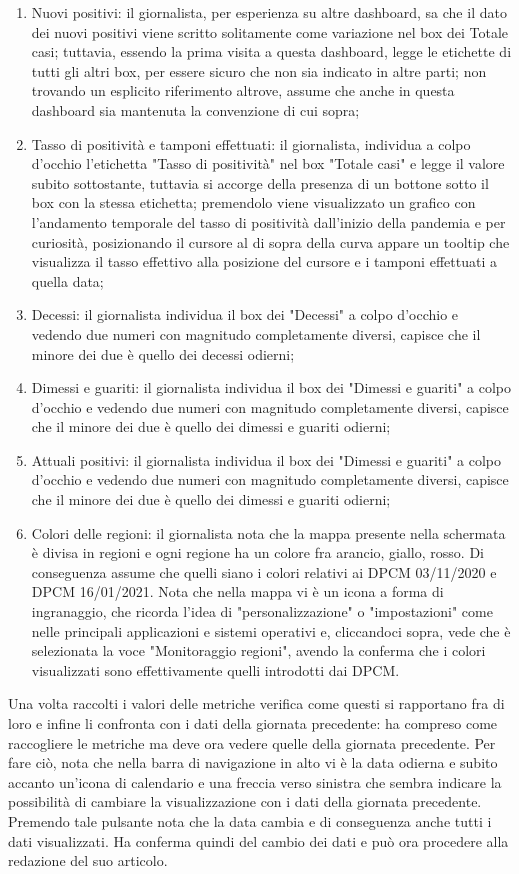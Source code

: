 \begin{enumerate}[label=\alph*.]
    \item Nuovi positivi: il giornalista, per esperienza su altre dashboard, sa che il dato dei nuovi positivi viene scritto solitamente come variazione nel box dei Totale casi; tuttavia, essendo la prima visita a questa dashboard, legge le etichette di tutti gli altri box, per essere sicuro che non sia indicato in altre parti; non trovando un esplicito riferimento altrove, assume che anche in questa dashboard sia mantenuta la convenzione di cui sopra;
    \item Tasso di positività e tamponi effettuati: il giornalista, individua a colpo d'occhio l'etichetta "Tasso di positività" nel box "Totale casi" e legge il valore subito sottostante, tuttavia si accorge della presenza di un bottone sotto il box con la stessa etichetta; premendolo viene visualizzato un grafico con l'andamento temporale del tasso di positività dall'inizio della pandemia e per curiosità, posizionando il cursore al di sopra della curva appare un tooltip che visualizza il tasso effettivo alla posizione del cursore e i tamponi effettuati a quella data;
    \item Decessi: il giornalista individua il box dei "Decessi" a colpo d'occhio e vedendo due numeri con magnitudo completamente diversi, capisce che il minore dei due è quello dei decessi odierni;
    \item Dimessi e guariti: il giornalista individua il box dei "Dimessi e guariti" a colpo d'occhio e vedendo due numeri con magnitudo completamente diversi, capisce che il minore dei due è quello dei dimessi e guariti odierni;
    \item Attuali positivi: il giornalista individua il box dei "Dimessi e guariti" a colpo d'occhio e vedendo due numeri con magnitudo completamente diversi, capisce che il minore dei due è quello dei dimessi e guariti odierni;
    \item Colori delle regioni: il giornalista nota che la mappa presente nella schermata è divisa in regioni e ogni regione ha un colore fra arancio, giallo, rosso. Di conseguenza assume che quelli siano i colori relativi ai DPCM 03/11/2020 e DPCM 16/01/2021. Nota che nella mappa vi è un icona a forma di ingranaggio, che ricorda l'idea di "personalizzazione" o "impostazioni" come nelle principali applicazioni e sistemi operativi e, cliccandoci sopra, vede che è selezionata la voce "Monitoraggio regioni", avendo la conferma che i colori visualizzati sono effettivamente quelli introdotti dai DPCM.
\end{enumerate}
Una volta raccolti i valori delle metriche verifica come questi si rapportano fra di loro e infine li confronta con i dati della giornata precedente: ha compreso come raccogliere le metriche ma deve ora vedere quelle della giornata precedente.
Per fare ciò, nota che nella barra di navigazione in alto vi è la data odierna e subito accanto un'icona di calendario e una freccia verso sinistra che sembra indicare la possibilità di cambiare la visualizzazione con i dati della giornata precedente.
Premendo tale pulsante nota che la data cambia e di conseguenza anche tutti i dati visualizzati.
Ha conferma quindi del cambio dei dati e può ora procedere alla redazione del suo articolo.


